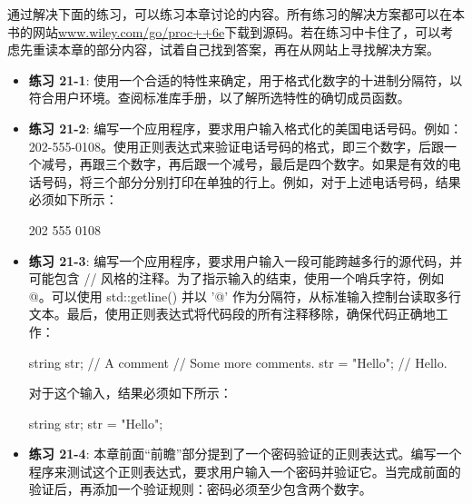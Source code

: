通过解决下面的练习，可以练习本章讨论的内容。所有练习的解决方案都可以在本书的网站\url{www.wiley.com/go/proc++6e}下载到源码。若在练习中卡住了，可以考虑先重读本章的部分内容，试着自己找到答案，再在从网站上寻找解决方案。

\begin{itemize}
\item
\textbf{练习 21-1}: 使用一个合适的特性来确定，用于格式化数字的十进制分隔符，以符合用户环境。查阅标准库手册，以了解所选特性的确切成员函数。

\item
\textbf{练习 21-2}: 编写一个应用程序，要求用户输入格式化的美国电话号码。例如：202-555-0108。使用正则表达式来验证电话号码的格式，即三个数字，后跟一个减号，再跟三个数字，再后跟一个减号，最后是四个数字。如果是有效的电话号码，将三个部分分别打印在单独的行上。例如，对于上述电话号码，结果必须如下所示：

\begin{shell}
202
555
0108
\end{shell}

\item
\textbf{练习 21-3}: 编写一个应用程序，要求用户输入一段可能跨越多行的源代码，并可能包含 // 风格的注释。为了指示输入的结束，使用一个哨兵字符，例如 @。可以使用 std::getline() 并以 '@' 作为分隔符，从标准输入控制台读取多行文本。最后，使用正则表达式将代码段的所有注释移除，确保代码正确地工作：

\begin{cpp}
string str; // A comment // Some more comments.
str = "Hello"; // Hello.
\end{cpp}

对于这个输入，结果必须如下所示：

\begin{shell}
string str;
str = "Hello";
\end{shell}

\item
\textbf{练习 21-4}: 本章前面“前瞻”部分提到了一个密码验证的正则表达式。编写一个程序来测试这个正则表达式，要求用户输入一个密码并验证它。当完成前面的验证后，再添加一个验证规则：密码必须至少包含两个数字。
\end{itemize}